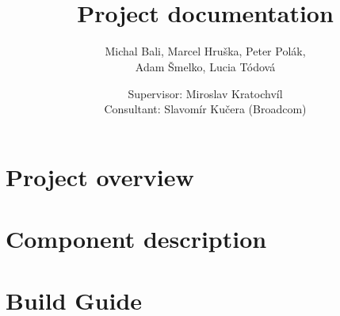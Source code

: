 \documentclass[10pt,a4paper]{report}
\title{\textcool{\bf High Level Assembler Plugin} \\ Project documentation}
\author{Michal Bali, Marcel Hruška, Peter Polák,\\ Adam Šmelko, Lucia Tódová}
\date{Supervisor: Miroslav Kratochvíl \\ \vspace{5mm} Consultant: Slavomír Kučera (Broadcom)}
\begin{document}
\maketitle


\tableofcontents



\part{Project overview}



\part{Component description}













\part{Build Guide}


 

\end{document}

